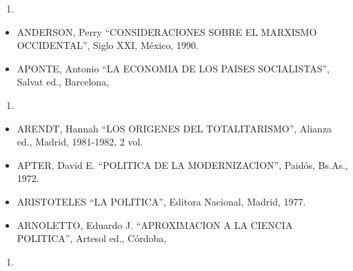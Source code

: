 \documentclass[
]{book}
\providecommand{\tightlist}{%
  \setlength{\itemsep}{0pt}\setlength{\parskip}{0pt}}
\begin{document}
\begin{enumerate}
\def\labelenumi{\arabic{enumi}.}
\setcounter{enumi}{1969}
\tightlist
\item
\end{enumerate}

\begin{itemize}
\tightlist
\item
  ANDERSON, Perry ``CONSIDERACIONES SOBRE EL MARXISMO OCCIDENTAL'', Siglo XXI,
  México, 1990.
\item
  APONTE, Antonio ``LA ECONOMIA DE LOS PAISES SOCIALISTAS'', Salvat ed., Barcelona,
\end{itemize}

\begin{enumerate}
\def\labelenumi{\arabic{enumi}.}
\setcounter{enumi}{1972}
\tightlist
\item
\end{enumerate}

\begin{itemize}
\tightlist
\item
  ARENDT, Hannah ``LOS ORIGENES DEL TOTALITARISMO'', Alianza ed., Madrid, 1981-1982,
  2 vol.
\item
  APTER, David E. ``POLITICA DE LA MODERNIZACION'', Paidós, Bs.As., 1972.
\item
  ARISTOTELES ``LA POLITICA'', Editora Nacional, Madrid, 1977.
\item
  ARNOLETTO, Eduardo J. ``APROXIMACION A LA CIENCIA POLITICA'', Artesol ed., Córdoba,
\end{itemize}

\begin{enumerate}
\def\labelenumi{\arabic{enumi}.}
\setcounter{enumi}{1988}
\tightlist
\item
\end{enumerate}
\end{document}
